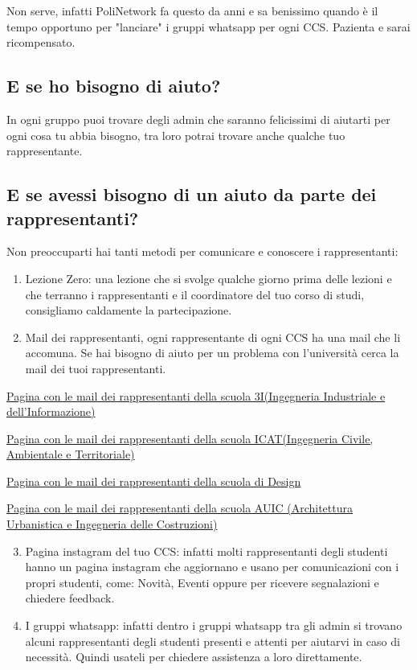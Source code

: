 \documentclass[legal]{polinetwork}
\begin{document}
Non serve, infatti PoliNetwork fa questo da anni e sa benissimo quando è il tempo opportuno per "lanciare" i gruppi whatsapp per ogni CCS. Pazienta e sarai ricompensato.

\subsection{E se ho bisogno di aiuto?}


In ogni gruppo puoi trovare degli admin che saranno felicissimi di aiutarti per ogni cosa tu abbia bisogno, tra loro potrai trovare anche qualche tuo rappresentante.

\subsection{E se avessi bisogno di un aiuto da parte dei rappresentanti?}


Non preoccuparti hai tanti metodi per comunicare e conoscere i rappresentanti:

\begin{enumerate}
  \item Lezione Zero: una lezione che si svolge qualche giorno prima delle lezioni e che terranno i rappresentanti e il coordinatore del tuo corso di studi, consigliamo caldamente la partecipazione.
  \item Mail dei rappresentanti, ogni rappresentante di ogni CCS ha una mail che li accomuna. Se hai bisogno di aiuto per un problema con l'università cerca la mail dei tuoi rappresentanti.
\end{enumerate}


\href{https://www.ingindinf.polimi.it/la-scuola/rappresentanti-degli-studenti}{Pagina con le mail dei rappresentanti della scuola 3I(Ingegneria Industriale e dell'Informazione)}

\href{https://www.ingcat.polimi.it/la-scuola/rappresentanti-degli-studenti}{Pagina con le mail dei rappresentanti della scuola ICAT(Ingegneria Civile, Ambientale e Territoriale)}

\href{https://www.design.polimi.it/la-scuola/rappresentanti-degli-studenti}{Pagina con le mail dei rappresentanti della scuola di Design}

\href{https://www.auic.polimi.it/la-scuola/rappresentanti-degli-studenti}{Pagina con le mail dei rappresentanti della scuola AUIC (Architettura Urbanistica e Ingegneria delle Costruzioni)}

\begin{enumerate}
  \setcounter{enumi}{2}
  \item Pagina instagram del tuo CCS: infatti molti rappresentanti degli studenti hanno un pagina instagram che aggiornano e usano per comunicazioni con i propri studenti, come: Novità, Eventi oppure per ricevere segnalazioni e chiedere feedback.
  \item I gruppi whatsapp: infatti dentro i gruppi whatsapp tra gli admin si trovano alcuni rappresentanti degli studenti presenti e attenti per aiutarvi in caso di necessità. Quindi usateli per chiedere assistenza a loro direttamente.
\end{enumerate}
\end{document}
